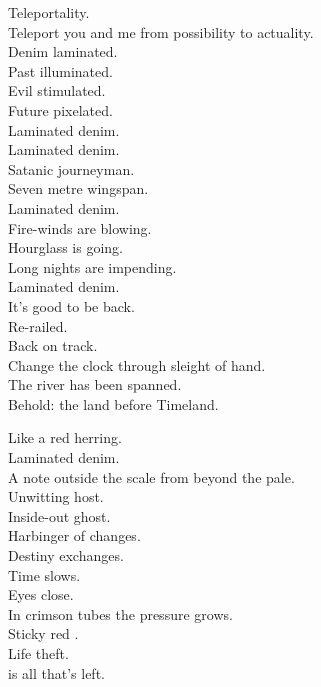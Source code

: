 Teleportality. \\
Teleport you and me from possibility to actuality. \\
Denim laminated. \\
Past illuminated. \\
Evil stimulated. \\
Future pixelated. \\

Laminated denim. \\

Laminated denim. \\
Satanic journeyman. \\
Seven metre wingspan. \\
Laminated denim. \\
Fire-winds are blowing. \\
Hourglass is going. \\
Long nights are impending. \\
Laminated denim. \\

It's good to be back. \\
Re-railed. \\
Back on track. \\
Change the clock through sleight of hand. \\
The river has been spanned. \\
Behold: the land before Timeland. \\




Like a red herring. \\
Laminated denim. \\
A note outside the scale from beyond the pale. \\
Unwitting host. \\
Inside-out ghost. \\
Harbinger of changes. \\
Destiny exchanges. \\
Time slows. \\
Eyes close. \\
In crimson tubes the pressure grows. \\
Sticky red . \\
Life theft. \\
 is all that's left. \\

